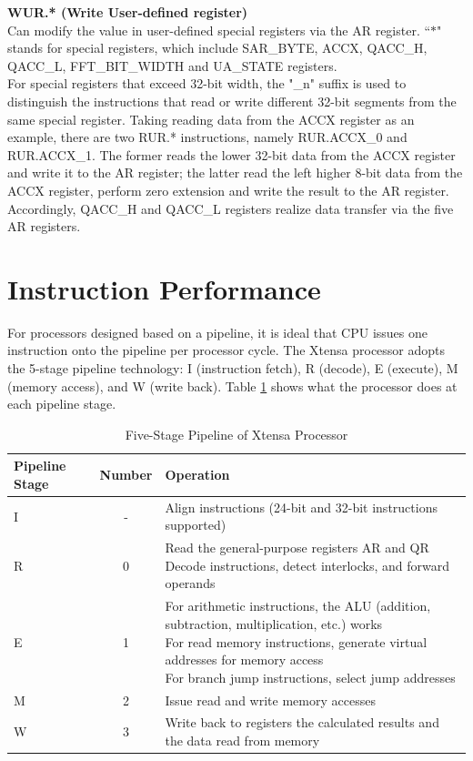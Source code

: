 \documentclass[main\_\_EN.tex]{subfiles}
\begin{document}
\textbf{WUR.* (Write User-defined register) }\\
Can modify the value in user-defined special registers via the AR register. ``$*$" stands for special registers, which include SAR\_BYTE, ACCX, QACC\_H, QACC\_L, FFT\_BIT\_WIDTH and UA\_STATE registers.\\
For special registers that exceed 32-bit width, the "\_n" suffix is used to distinguish the instructions that read or write different 32-bit segments from the same special register. Taking reading data from the ACCX register as an example, there are two RUR.* instructions, namely RUR.ACCX\_0 and RUR.ACCX\_1. The former reads the lower 32-bit data from the ACCX register and write it to the AR register; the latter read the left higher 8-bit data from the ACCX register, perform zero extension and write the result to the AR register. Accordingly, QACC\_H and QACC\_L registers realize data transfer via the five AR registers.




\clearpage
\section{Instruction Performance}\label{subsec:pie_pipeline}
For processors designed based on a pipeline, it is ideal that CPU issues one instruction onto the pipeline per processor cycle. The \chipname{} Xtensa processor adopts the 5-stage pipeline technology: I (instruction fetch), R (decode), E (execute), M (memory access), and W (write back). Table \ref{tab:pie_processor_5stage} shows what the processor does at each pipeline stage. \\

\begin{longtable}[c]{|l|c|l|}
    \caption{Five-Stage Pipeline of Xtensa Processor}
    \label{tab:pie_processor_5stage}\\
    \hline
    \rowcolor{lightgray}
    \textbf{Pipeline Stage} & \textbf{Number} & \textbf{Operation} \\\hline
    I & - & Align instructions (24-bit and 32-bit instructions supported)\\\hline
    R & 0 & \makecell[l]{Read the general-purpose registers AR and QR\\Decode instructions, detect interlocks, and forward operands}\\\hline
    E & 1 & \makecell[l]{For arithmetic instructions, the ALU (addition, subtraction, multiplication, etc.) works\\For read memory instructions, generate virtual addresses for memory access\\For branch jump instructions, select jump addresses}\\\hline
    M & 2 & Issue read and write memory accesses \\\hline
    W & 3 & Write back to registers the calculated results and the data read from memory\\\hline
\end{longtable}
\end{document}
